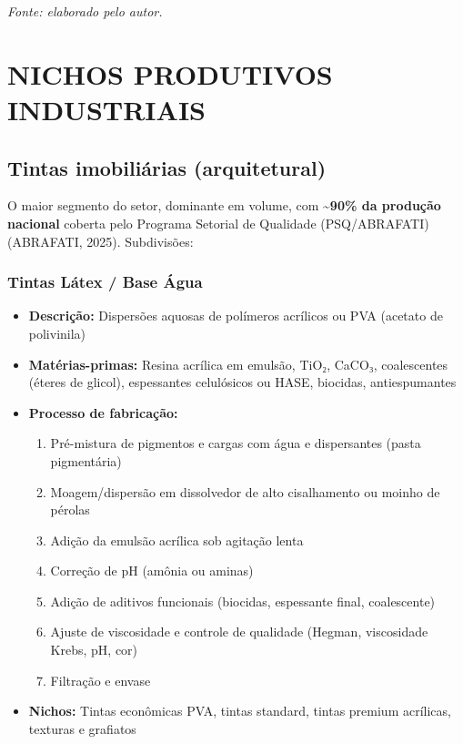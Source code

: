 \documentclass[
  12pt,
  a4paper,
  oneside,
  brazil,
  chapter=TITLE
]{article}
\newcommand{\secbreak}{\clearpage}
\let\oldsection\section
\renewcommand{\section}{\secbreak\oldsection}
\newcommand{\quadrofonte}[1]{\par\noindent\textit{Fonte: #1}\vspace{1em}\par}
\begin{document}
\quadrofonte{elaborado pelo autor.}

\section{NICHOS PRODUTIVOS
INDUSTRIAIS}\label{nichos-produtivos-industriais}

\subsection{Tintas imobiliárias
(arquitetural)}\label{tintas-imobiliuxe1rias-arquitetural}

O maior segmento do setor, dominante em volume, com
\textasciitilde{}\textbf{90\% da produção nacional} coberta pelo
Programa Setorial de Qualidade (PSQ/ABRAFATI) (ABRAFATI, 2025).
Subdivisões:

\subsubsection{Tintas Látex / Base
Água}\label{tintas-luxe1tex-base-uxe1gua}

\begin{itemize}
\tightlist
\item
  \textbf{Descrição:} Dispersões aquosas de polímeros acrílicos ou PVA
  (acetato de polivinila)
\item
  \textbf{Matérias-primas:} Resina acrílica em emulsão, TiO₂, CaCO₃,
  coalescentes (éteres de glicol), espessantes celulósicos ou HASE,
  biocidas, antiespumantes
\item
  \textbf{Processo de fabricação:}

  \begin{enumerate}
  \def\labelenumi{\arabic{enumi}.}
  \tightlist
  \item
    Pré-mistura de pigmentos e cargas com água e dispersantes (pasta
    pigmentária)
  \item
    Moagem/dispersão em dissolvedor de alto cisalhamento ou moinho de
    pérolas
  \item
    Adição da emulsão acrílica sob agitação lenta
  \item
    Correção de pH (amônia ou aminas)
  \item
    Adição de aditivos funcionais (biocidas, espessante final,
    coalescente)
  \item
    Ajuste de viscosidade e controle de qualidade (Hegman, viscosidade
    Krebs, pH, cor)
  \item
    Filtração e envase
  \end{enumerate}
\item
  \textbf{Nichos:} Tintas econômicas PVA, tintas standard, tintas
  premium acrílicas, texturas e grafiatos
\end{itemize}
\end{document}

